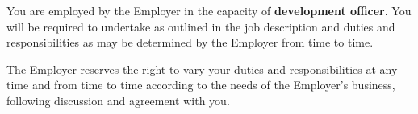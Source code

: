 \documentclass[a4paper,11pt,onecolumn ]{article}
\begin{document}
\begin{legal}
  \item {}
  \begin{legal}
  \item You are employed by the Employer in the capacity of \textbf{development officer}. You will
  be required to undertake as outlined in the job description and duties and
  responsibilities as may be determined by the Employer from time to time.
  \item The Employer reserves the right to vary your duties and responsibilities at any
  time and from time to time according to the needs of the Employer’s business,
  following discussion and agreement with you.
  \end{legal}
\end{legal}
\end{document}

